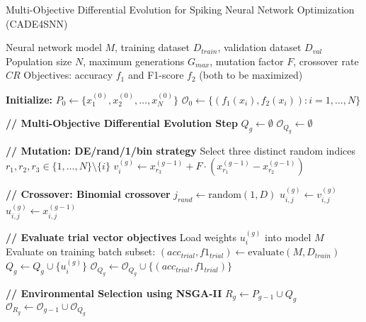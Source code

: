 \documentclass{article}
\begin{document}
\begin{algorithm}
\caption{Multi-Objective Differential Evolution for Spiking Neural Network Optimization (CADE4SNN)}
\label{alg:mo-de-snn}
\begin{algorithmic}[1]

\REQUIRE Neural network model $M$, training dataset $D_{train}$, validation dataset $D_{val}$
\REQUIRE Population size $N$, maximum generations $G_{max}$, mutation factor $F$, crossover rate $CR$
\REQUIRE Objectives: accuracy $f_1$ and F1-score $f_2$ (both to be maximized)

\STATE \textbf{Initialize:}
\STATE $P_0 \leftarrow \{x_1^{(0)}, x_2^{(0)}, \ldots, x_N^{(0)}\}$ 
\STATE $\mathcal{O}_0 \leftarrow \{(f_1(x_i), f_2(x_i)) : i = 1, \ldots, N\}$ 

    \STATE \textbf{// Multi-Objective Differential Evolution Step}
    \STATE $Q_g \leftarrow \emptyset$ 
    \STATE $\mathcal{O}_{Q_g} \leftarrow \emptyset$ 
    
        \STATE \textbf{// Mutation: DE/rand/1/bin strategy}
        \STATE Select three distinct random indices $r_1, r_2, r_3 \in \{1, \ldots, N\} \setminus \{i\}$
        \STATE $v_i^{(g)} \leftarrow x_{r_3}^{(g-1)} + F \cdot (x_{r_1}^{(g-1)} - x_{r_2}^{(g-1)})$ 
        
        \STATE \textbf{// Crossover: Binomial crossover}
        \STATE $j_{rand} \leftarrow \text{random}(1, D)$ 
         
                \STATE $u_{i,j}^{(g)} \leftarrow v_{i,j}^{(g)}$
            \ELSE
                \STATE $u_{i,j}^{(g)} \leftarrow x_{i,j}^{(g-1)}$
            \ENDIF
        \ENDFOR
        
        \STATE \textbf{// Evaluate trial vector objectives}
        \STATE Load weights $u_i^{(g)}$ into model $M$
        \STATE Evaluate on training batch subset: $(acc_{trial}, f1_{trial}) \leftarrow \text{evaluate}(M, D_{train})$
        \STATE $Q_g \leftarrow Q_g \cup \{u_i^{(g)}\}$
        \STATE $\mathcal{O}_{Q_g} \leftarrow \mathcal{O}_{Q_g} \cup \{(acc_{trial}, f1_{trial})\}$
    \ENDFOR
    
    \STATE \textbf{// Environmental Selection using NSGA-II}
    \STATE $R_g \leftarrow P_{g-1} \cup Q_g$ 
    \STATE $\mathcal{O}_{R_g} \leftarrow \mathcal{O}_{g-1} \cup \mathcal{O}_{Q_g}$ 
    

\end{algorithmic}
\end{algorithm}
\end{document}
